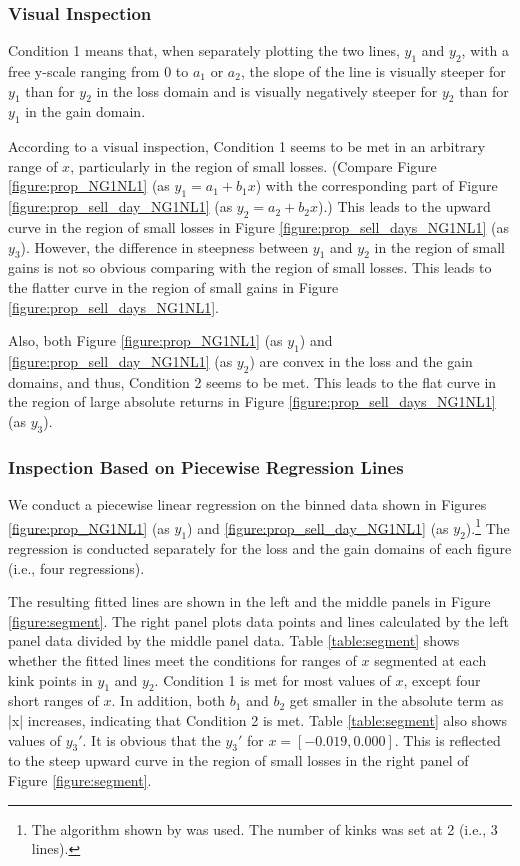 \documentclass[11pt, a4paper]{article}
\begin{document}
\subsubsection{Visual Inspection}
Condition 1 means that, when separately plotting the two lines, $y_1$ and $y_2$, with a free y-scale ranging from 0 to $a_1$ or $a_2$, the slope of the line is visually steeper for $y_1$ than for $y_2$ in the loss domain and is visually negatively steeper for $y_2$ than for $y_1$ in the gain domain. 

According to a visual inspection, Condition 1 seems to be met in an arbitrary range of $x$, particularly in the region of small losses. (Compare Figure \ref{figure:prop_NG1NL1} (as $y_1=a_1+b_1x$) with the corresponding part of Figure \ref{figure:prop_sell_day_NG1NL1} (as $y_2=a_2+b_2x$).) This leads to the upward curve in the region of small losses in Figure \ref{figure:prop_sell_days_NG1NL1} (as $y_3$).
However, the difference in steepness between $y_1$ and $y_2$ in the region of small gains is not so obvious comparing with the region of small losses. This leads to the flatter curve in the region of small gains in Figure \ref{figure:prop_sell_days_NG1NL1}.


Also, both Figure \ref{figure:prop_NG1NL1} (as $y_1$) and \ref{figure:prop_sell_day_NG1NL1} (as $y_2$) are convex in the loss and the gain domains, and thus, Condition 2 seems to be met. This leads to the flat curve in the region of large absolute returns in Figure \ref{figure:prop_sell_days_NG1NL1} (as $y_3$).

\subsubsection{Inspection Based on Piecewise Regression Lines}
We conduct a piecewise linear regression on the binned data shown in Figures \ref{figure:prop_NG1NL1} (as $y_1$) and \ref{figure:prop_sell_day_NG1NL1} (as $y_2$).\footnote{The algorithm shown by \citet{muggeo2008} was used. The number of kinks was set at 2 (i.e., 3 lines).} The regression is conducted separately for the loss and the gain domains of each figure (i.e., four regressions). 

The resulting fitted lines are shown in the left and the middle panels in Figure \ref{figure:segment}. The right panel plots data points and lines calculated by the left panel data divided by the middle panel data.
Table \ref{table:segment} shows whether the fitted lines meet the conditions for ranges of $x$ segmented at each kink points in $y_1$ and $y_2$. Condition 1 is met for most values of $x$, except four short ranges of $x$. In addition, both $b_1$ and $b_2$ get smaller in the absolute term as |x| increases, indicating that Condition 2 is met.   
Table \ref{table:segment} also shows values of $y_3'$. It is obvious that the $y_3'$ for $x=[-0.019, 0.000]$. This is reflected to the steep upward curve in the region of small losses in the right panel of Figure \ref{figure:segment}.
\end{document}
